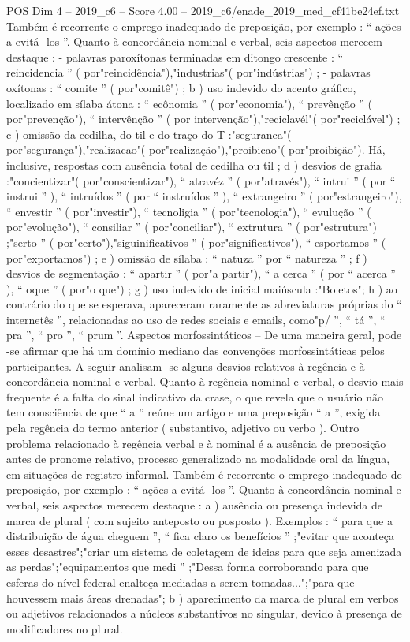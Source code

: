 \begin{textsample}{POS Dim 4 – 2019\_c6 – Score 4.00 – 2019\_c6/enade\_2019\_med\_cf41be24ef.txt}
Também é recorrente o emprego inadequado de preposição, por exemplo : “ ações a evitá -los ”.
Quanto à concordância nominal e verbal, seis aspectos merecem destaque : - palavras paroxítonas terminadas em ditongo crescente : “ reincidencia ” ( por"reincidência"),"industrias"( por"indústrias") ; - palavras oxítonas : “ comite ” ( por"comitê") ; b ) uso indevido do acento gráfico, localizado em sílaba átona : “ ecônomia ” ( por"economia"), “ prevênção ” ( por"prevenção"), “ intervênção ” ( por intervenção"),"reciclavél"( por"reciclável") ; c ) omissão da cedilha, do til e do traço do T :"seguranca"( por"segurança"),"realizacao"( por"realização"),"proibicao"( por"proibição").
Há, inclusive, respostas com ausência total de cedilha ou til ; d ) desvios de grafia :"concientizar"( por"conscientizar"), “ atravéz ” ( por"através"), “ intrui ” ( por “ instrui ” ), “ intruídos ” ( por “ instruídos ” ), “ extrangeiro ” ( por"estrangeiro"), “ envestir ” ( por"investir"), “ tecnoligia ” ( por"tecnologia"), “ evulução ” ( por"evolução"), “ consiliar ” ( por"conciliar"), “ extrutura ” ( por"estrutura") ;"serto ” ( por"certo"),"siguinificativos ” ( por"significativos"), “ esportamos ” ( por"exportamos") ; e ) omissão de sílaba : “ natuza ” por “ natureza ” ; f ) desvios de segmentação : “ apartir ” ( por"a partir"), “ a cerca ” ( por “ acerca ” ), “ oque ” ( por"o que") ; g ) uso indevido de inicial maiúscula :"Boletos"; h ) ao contrário do que se esperava, apareceram raramente as abreviaturas próprias do “ internetês ”, relacionadas ao uso de redes sociais e emails, como"p/ ”, “ tá ”, “ pra ”, “ pro ”, “ prum ”.
Aspectos morfossintáticos – De uma maneira geral, pode -se afirmar que há um domínio mediano das convenções morfossintáticas pelos participantes.
A seguir analisam -se alguns desvios relativos à regência e à concordância nominal e verbal.
Quanto à regência nominal e verbal, o desvio mais frequente é a falta do sinal indicativo da crase, o que revela que o usuário não tem consciência de que “ a ” reúne um artigo e uma preposição “ a ”, exigida pela regência do termo anterior ( substantivo, adjetivo ou verbo ).
Outro problema relacionado à regência verbal e à nominal é a ausência de preposição antes de pronome relativo, processo generalizado na modalidade oral da língua, em situações de registro informal.
Também é recorrente o emprego inadequado de preposição, por exemplo : “ ações a evitá -los ”.
Quanto à concordância nominal e verbal, seis aspectos merecem destaque : a ) ausência ou presença indevida de marca de plural ( com sujeito anteposto ou posposto ).
Exemplos : “ para que a distribuição de água cheguem ”, “ fica claro os benefícios ” ;"evitar que aconteça esses desastres";"criar um sistema de coletagem de ideias para que seja amenizada as perdas";"equipamentos que medi ” ;"Dessa forma corroborando para que esferas do nível federal enalteça mediadas a serem tomadas...";"para que houvessem mais áreas drenadas"; b ) aparecimento da marca de plural em verbos ou adjetivos relacionados a núcleos substantivos no singular, devido à presença de modificadores no plural.

\end{textsample}
